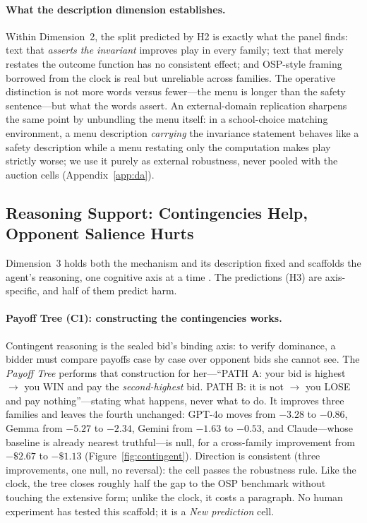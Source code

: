 \paragraph{What the description dimension establishes.}
Within Dimension~2, the split predicted by H2 is exactly what the panel finds: text that \emph{asserts the invariant} improves play in every family; text that merely restates the outcome function has no consistent effect; and OSP-style framing borrowed from the clock is real but unreliable across families. The operative distinction is not more words versus fewer---the menu is longer than the safety sentence---but what the words assert. An external-domain replication sharpens the same point by unbundling the menu itself: in a school-choice matching environment, a menu description \emph{carrying} the invariance statement behaves like a safety description while a menu restating only the computation makes play strictly worse; we use it purely as external robustness, never pooled with the auction cells (Appendix~\ref{app:da}).

\subsection{Reasoning Support: Contingencies Help, Opponent Salience Hurts}\label{sec:map-scaffolds}

Dimension~3 holds both the mechanism and its description fixed and scaffolds the agent's reasoning, one cognitive axis at a time \citep{li2024designing}. The predictions (H3) are axis-specific, and half of them predict harm.

\paragraph{Payoff Tree (C1): constructing the contingencies works.}
Contingent reasoning is the sealed bid's binding axis: to verify dominance, a bidder must compare payoffs case by case over opponent bids she cannot see. The \emph{Payoff Tree} performs that construction for her---``PATH A: your bid is highest $\to$ you WIN and pay the \emph{second-highest} bid. PATH B: it is not $\to$ you LOSE and pay nothing''---stating what happens, never what to do. It improves three families and leaves the fourth unchanged: GPT-4o moves from $-3.28$ to $-0.86$, Gemma from $-5.27$ to $-2.34$, Gemini from $-1.63$ to $-0.53$, and Claude---whose baseline is already nearest truthful---is null, for a cross-family improvement from $-\$2.67$ to $-\$1.13$ (Figure~\ref{fig:contingent}). Direction is consistent (three improvements, one null, no reversal): the cell passes the robustness rule. Like the clock, the tree closes roughly half the gap to the OSP benchmark without touching the extensive form; unlike the clock, it costs a paragraph. No human experiment has tested this scaffold; it is a \emph{New prediction} cell.

